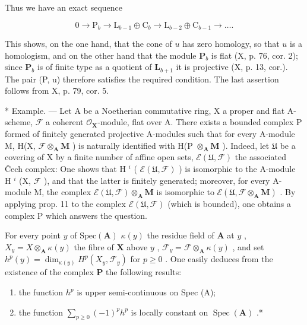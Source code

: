 Thus we have an exact sequence

\[
0 \rightarrow \mathrm{P} _ {b} \rightarrow \mathrm{L} _ {b - 1} \oplus \mathrm{C} _ {b} \rightarrow \mathrm{L} _ {b - 2} \oplus \mathrm{C} _ {b - 1} \rightarrow \dots .
\]

This shows, on the one hand, that the cone of \(u\) has zero homology, so that \(u\) is a homologism, and on the other hand that the module \(\mathbf{P}_{b}\) is flat (X, p. 76, cor. 2); since \(\mathbf{P}_{b}\) is of finite type as a quotient of \(\mathbf{L}_{b+1}\) it is projective (X, p. 13, cor.). The pair (P, u) therefore satisfies the required condition. The last assertion follows from X, p. 79, cor. 5.

* Example. --- Let A be a Noetherian commutative ring, X a proper and flat A-scheme, \(\mathcal{F}\) a coherent \(\mathcal{O}_{\mathbf{X}}\)-module, flat over A. There exists a bounded complex P formed of finitely generated projective A-modules such that for every A-module M, H(X, \(\mathcal{F} \otimes_{\mathbf{A}} \mathbf{M}\) ) is naturally identified with H(P \(\otimes_{\mathbf{A}} \mathbf{M}\) ). Indeed, let \(\mathfrak{U}\) be a covering of X by a finite number of affine open sets, \(\mathcal{E}(\mathfrak{U}, \mathcal{F})\) the associated Čech complex: One shows that H \(^{i}\) ( \(\mathcal{E}(\mathfrak{U}, \mathcal{F})\) ) is isomorphic to the A-module H \(^{i}\) (X, \(\mathcal{F}\) ), and that the latter is finitely generated; moreover, for every A-module M, the complex \(\mathcal{E}(\mathfrak{U}, \mathcal{F}) \otimes_{\mathbf{A}} \mathbf{M}\) is isomorphic to \(\mathcal{E}(\mathfrak{U}, \mathcal{F} \otimes_{\mathbf{A}} \mathbf{M})\) . By applying prop. 11 to the complex \(\mathcal{E}(\mathfrak{U}, \mathcal{F})\) (which is bounded), one obtains a complex P which answers the question.

For every point \(y\) of \(\text{Spec}(\mathbf{A})\)  \(\kappa(y)\) the residue field of \(\mathbf{A}\) at \(y\) , \(X_y = X \otimes_{\mathbf{A}} \kappa(y)\) the fibre of \(\mathbf{X}\) above \(y\) , \(\mathcal{F}_y = \mathcal{F} \otimes_{\mathbf{A}} \kappa(y)\) , and set \(h^p(y) = \dim_{\kappa(y)} H^p(X_y, \mathcal{F}_y)\) for \(p \geqslant 0\) . One easily deduces from the existence of the complex \(\mathbf{P}\) the following results:

\begin{enumerate}
\def\labelenumi{(\roman{enumi})}
\item
  the function \(h^{p}\) is upper semi-continuous on Spec (A);
\item
  the function \(\sum_{p\geqslant 0}(-1)^{p}h^{p}\) is locally constant on \(\operatorname {Spec}(\mathbf{A})\) .*
\end{enumerate}

